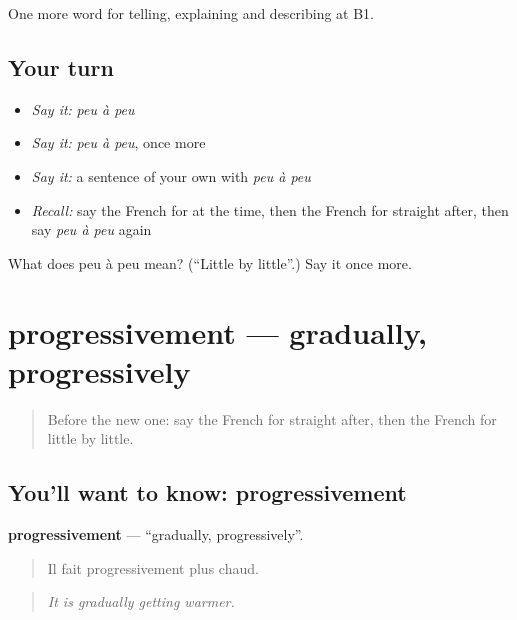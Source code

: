 \begin{grammarlens}[title={What you've built}]
One more word for telling, explaining and describing at B1.
\end{grammarlens}

\subsection*{Your turn}
\begin{itemize}
\raggedright
  \item \emph{Say it:} \emph{peu à peu}
  \item \emph{Say it:} \emph{peu à peu}, once more
  \item \emph{Say it:} a sentence of your own with \emph{peu à peu}
  \item \emph{Recall:} say the French for at the time, then the French for straight after, then say \emph{peu à peu} again
\end{itemize}

\begin{tcolorbox}[breakable,colback=teal!4,colframe=teal!35!black,title={Before you move on}]
What does peu à peu mean? (\textquotedblleft{}Little by little\textquotedblright{}.) Say it once more.
\end{tcolorbox}
\section[progressivement]{progressivement — gradually, progressively}

\label{lesson:FR-C271-progressivement}



\begin{quote}
Before the new one: say the French for straight after, then the French for little by little.
\end{quote}

\subsection*{You'll want to know: progressivement}
\textbf{progressivement} — \textquotedblleft{}gradually, progressively\textquotedblright{}.

\begin{quote}
Il fait progressivement plus chaud.
\end{quote}

\begin{quote}
\emph{It is gradually getting warmer.}
\end{quote}

